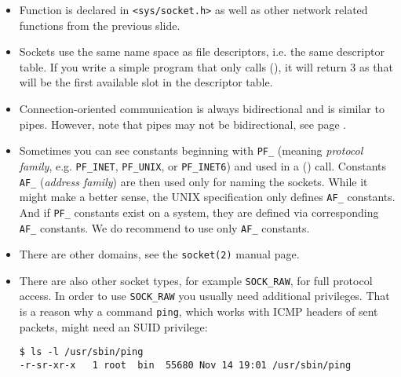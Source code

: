 \begin{itemize}
\item Function is declared in \texttt{<sys/socket.h>} as well as other network
related functions from the previous slide.
\item Sockets use the same name space as file descriptors, i.e. the same
descriptor table.  If you write a simple program that only calls
(), it will return 3 as that will be the first available slot in
the descriptor table.
\item Connection-oriented communication is always bidirectional and is similar
to pipes.  However, note that pipes may not be bidirectional, see page
\pageref{TWO_WAY_PIPES}.
\item Sometimes you can see constants beginning with \verb#PF_# (meaning
\emph{protocol family}, e.g. \texttt{PF\_IN\-ET}, \verb#PF_UNIX#, or
\texttt{PF\_IN\-ET6}) and used in a () call. Constants \verb#AF_#
(\emph{address family}) are then used only for naming the sockets.  While it
might make a better sense, the UNIX specification only defines \verb#AF_#
constants.  And if \verb#PF_# constants exist on a system, they are defined via
corresponding \verb#AF_# constants.  We do recommend to use only \verb#AF_#
constants.
\item There are other domains, see the \texttt{socket(2)} manual page.
\item There are also other socket types, for example \texttt{SOCK\_RAW}, for
full protocol access. In order to use \texttt{SOCK\_RAW} you usually need
additional privileges.  That is a reason why a command \texttt{ping}, which
works with ICMP headers of sent packets, might need an SUID privilege:

\begin{verbatim}
$ ls -l /usr/sbin/ping
-r-sr-xr-x   1 root  bin  55680 Nov 14 19:01 /usr/sbin/ping
\end{verbatim}
\end{itemize}




